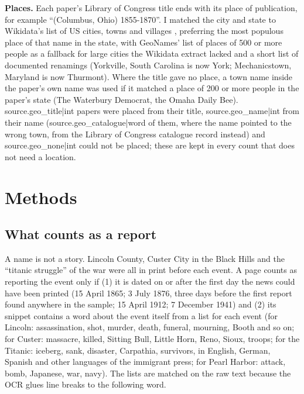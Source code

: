 \documentclass[11pt,a4paper]{article}
\begin{document}
\textbf{Places.} Each paper's Library of Congress title ends with its place of publication, for example ``(Columbus, Ohio) 1855-1870''. I matched the city and state to Wikidata's list of US cities, towns and villages \citep{wikidata}, preferring the most populous place of that name in the state, with GeoNames' list of places of 500 or more people \citep{geonames} as a fallback for large cities the Wikidata extract lacked and a short list of documented renamings (Yorkville, South Carolina is now York; Mechanicstown, Maryland is now Thurmont). Where the title gave no place, a town name inside the paper's own name was used if it matched a place of 200 or more people in the paper's state (The Waterbury Democrat, the Omaha Daily Bee). {{source.geo_title|int}} papers were placed from their title, {{source.geo_name|int}} from their name ({{source.geo_catalogue|word}} of them, where the name pointed to the wrong town, from the Library of Congress catalogue record instead) and {{source.geo_none|int}} could not be placed; these are kept in every count that does not need a location.

\section{Methods}
\subsection{What counts as a report}
A name is not a story. Lincoln County, Custer City in the Black Hills and the ``titanic struggle'' of the war were all in print before each event. A page counts as reporting the event only if (1) it is dated on or after the first day the news could have been printed (15 April 1865; 3 July 1876, three days before the first report found anywhere in the sample; 15 April 1912; 7 December 1941) and (2) its snippet contains a word about the event itself from a list for each event (for Lincoln: assassination, shot, murder, death, funeral, mourning, Booth and so on; for Custer: massacre, killed, Sitting Bull, Little Horn, Reno, Sioux, troops; for the Titanic: iceberg, sank, disaster, Carpathia, survivors, in English, German, Spanish and other languages of the immigrant press; for Pearl Harbor: attack, bomb, Japanese, war, navy). The lists are matched on the raw text because the OCR glues line breaks to the following word.
\end{document}
